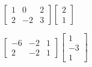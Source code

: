 \begin{pa}
    

    \item $\left[ \begin{array}{rrr} 1 & 0 & 2\\ 2 & -2 & 3  \end{array} \right] \left[ \begin{array}{r} 2\\1 \end{array} \right]$

    
		
		\item $\left[ \begin{array}{rrc} -6 & -2 & 1\\ 2 & -2 & 1  \end{array} \right] \left[ \begin{array}{r} 1\\-3 \\1\end{array} \right]$

    

    \ea


\end{pa}
